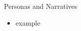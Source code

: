\begin{Slide}{Personas and Narratives}
\begin{itemize}
\item \TODO example


\end{itemize}
\end{Slide}
